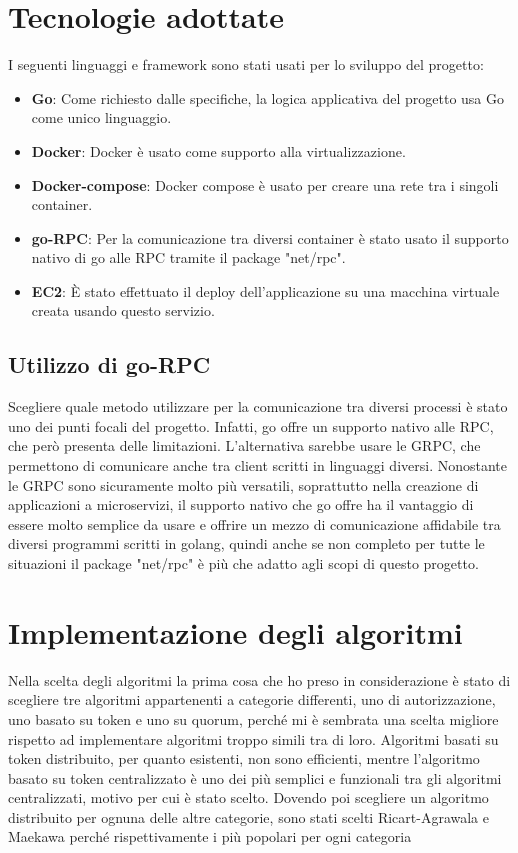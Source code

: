 \documentclass[conference]{IEEEtran}
\begin{document}
\section{Tecnologie adottate}
I seguenti linguaggi e framework sono stati usati per lo sviluppo del progetto:
\begin{itemize}
\item \textbf{Go}: Come richiesto dalle specifiche, la logica applicativa del progetto usa Go come unico linguaggio.
\item \textbf{Docker}: Docker è usato come supporto alla virtualizzazione.
\item \textbf{Docker-compose}: Docker compose è usato per creare una rete tra i singoli container.
\item \textbf{go-RPC}: Per la comunicazione tra diversi container è stato usato il supporto nativo di go alle RPC tramite il package "net/rpc".
\item \textbf{EC2}: \`E stato effettuato il deploy dell'applicazione su una macchina virtuale creata usando questo servizio.
\end{itemize}

\subsection*{Utilizzo di go-RPC}

Scegliere quale metodo utilizzare per la comunicazione tra diversi processi è stato uno dei punti focali del progetto. Infatti, go offre un supporto nativo alle RPC, che però presenta delle limitazioni. L'alternativa sarebbe usare le GRPC, che permettono di comunicare anche tra client scritti in linguaggi diversi. Nonostante le GRPC sono sicuramente molto più versatili, soprattutto nella creazione di applicazioni a microservizi, il supporto nativo che go offre ha il vantaggio di essere molto semplice da usare e offrire un mezzo di comunicazione affidabile tra diversi programmi scritti in golang, quindi anche se non completo per tutte le situazioni il package "net/rpc" è più che adatto agli scopi di questo progetto.

\section{Implementazione degli algoritmi}

Nella scelta degli algoritmi la prima cosa che ho preso in considerazione è stato di scegliere tre algoritmi appartenenti a categorie differenti, uno di autorizzazione, uno basato su token e uno su quorum, perché mi è sembrata una scelta migliore rispetto ad implementare algoritmi troppo simili tra di loro. Algoritmi basati su token distribuito, per quanto esistenti, non sono efficienti, mentre l'algoritmo basato su token centralizzato è uno dei più semplici e funzionali tra gli algoritmi centralizzati, motivo per cui è stato scelto. Dovendo poi scegliere un algoritmo distribuito per ognuna delle altre categorie, sono stati scelti Ricart-Agrawala e Maekawa perché rispettivamente i più popolari per ogni categoria
 
\end{document}
